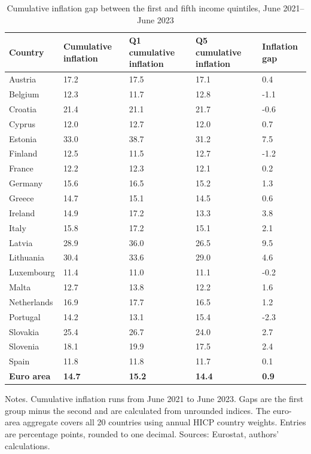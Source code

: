 \begin{table}[H]
\small
\setlength{\tabcolsep}{5pt}
\renewcommand{\arraystretch}{0.95}

\caption{\label{tab:country-heterogeneity-cumulative-gap}Cumulative inflation gap between the first and fifth income quintiles, June 2021--June 2023}
\centering
\begin{tabular}[t]{lllll}
\toprule
Country & Cumulative inflation & Q1 cumulative inflation & Q5 cumulative inflation & Inflation gap\\
\midrule
Austria & 17.2 & 17.5 & 17.1 & 0.4\\
Belgium & 12.3 & 11.7 & 12.8 & -1.1\\
Croatia & 21.4 & 21.1 & 21.7 & -0.6\\
Cyprus & 12.0 & 12.7 & 12.0 & 0.7\\
Estonia & 33.0 & 38.7 & 31.2 & 7.5\\
\addlinespace
Finland & 12.5 & 11.5 & 12.7 & -1.2\\
France & 12.2 & 12.3 & 12.1 & 0.2\\
Germany & 15.6 & 16.5 & 15.2 & 1.3\\
Greece & 14.7 & 15.1 & 14.5 & 0.6\\
Ireland & 14.9 & 17.2 & 13.3 & 3.8\\
\addlinespace
Italy & 15.8 & 17.2 & 15.1 & 2.1\\
Latvia & 28.9 & 36.0 & 26.5 & 9.5\\
Lithuania & 30.4 & 33.6 & 29.0 & 4.6\\
Luxembourg & 11.4 & 11.0 & 11.1 & -0.2\\
Malta & 12.7 & 13.8 & 12.2 & 1.6\\
\addlinespace
Netherlands & 16.9 & 17.7 & 16.5 & 1.2\\
Portugal & 14.2 & 13.1 & 15.4 & -2.3\\
Slovakia & 25.4 & 26.7 & 24.0 & 2.7\\
Slovenia & 18.1 & 19.9 & 17.5 & 2.4\\
Spain & 11.8 & 11.8 & 11.7 & 0.1\\
\addlinespace
\midrule
\textbf{Euro area} & \textbf{14.7} & \textbf{15.2} & \textbf{14.4} & \textbf{0.9}\\
\bottomrule
\end{tabular}
\vspace{-0.4em}
\begin{flushleft}
\footnotesize{Notes. Cumulative inflation runs from June 2021 to June 2023. Gaps are the first group minus the second and are calculated from unrounded indices. The euro-area aggregate covers all 20 countries using annual HICP country weights. Entries are percentage points, rounded to one decimal. Sources: Eurostat, authors' calculations.}
\end{flushleft}
\end{table}
